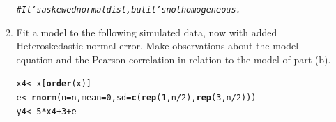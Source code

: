 \documentclass{article}\usepackage[]{graphicx}\usepackage[]{color}
\makeatletter
\newcommand{\hlnum}[1]{\textcolor[rgb]{0.686,0.059,0.569}{#1}}%
\newcommand{\hlcom}[1]{\textcolor[rgb]{0.678,0.584,0.686}{\textit{#1}}}%
\newcommand{\hlopt}[1]{\textcolor[rgb]{0,0,0}{#1}}%
\newcommand{\hlstd}[1]{\textcolor[rgb]{0.345,0.345,0.345}{#1}}%
\newcommand{\hlkwb}[1]{\textcolor[rgb]{0.69,0.353,0.396}{#1}}%
\newcommand{\hlkwc}[1]{\textcolor[rgb]{0.333,0.667,0.333}{#1}}%
\newcommand{\hlkwd}[1]{\textcolor[rgb]{0.737,0.353,0.396}{\textbf{#1}}}%
\newenvironment{kframe}{%
 \def\at@end@of@kframe{}%
 \ifinner\ifhmode%
  \def\at@end@of@kframe{\end{minipage}}%
  \begin{minipage}{\columnwidth}%
 \fi\fi%
 \def\FrameCommand##1{\hskip\@totalleftmargin \hskip-\fboxsep
 \colorbox{shadecolor}{##1}\hskip-\fboxsep
     \hskip-\linewidth \hskip-\@totalleftmargin \hskip\columnwidth}%
 \MakeFramed {\advance\hsize-\width
   \@totalleftmargin\z@ \linewidth\hsize
   \@setminipage}}%
 {\par\unskip\endMakeFramed%
 \at@end@of@kframe}
\newenvironment{knitrout}{}{} %
\makeatother
\begin{document}
\begin{enumerate}
\begin{enumerate}
\begin{knitrout}
\begin{kframe}
{\ttfamily\noindent\bfseries\color{errorcolor}{\#\# Error in p1 | p4: operations are possible only for numeric, logical or complex types}}\begin{alltt}
\hlcom{#It's a skewed normal dist, but it's not homogeneous.}
\end{alltt}
\end{kframe}
\end{knitrout}
\item Fit a model to the following simulated data, now with added Heteroskedastic
normal error. Make observations about the model equation and the Pearson correlation
in relation to the model of part (b).
\begin{knitrout}
\color{fgcolor}\begin{kframe}
\begin{alltt}
\hlstd{x4}\hlkwb{<-}\hlstd{x[}\hlkwd{order}\hlstd{(x)]}
\hlstd{e}\hlkwb{<-}\hlkwd{rnorm}\hlstd{(}\hlkwc{n}\hlstd{=n,}\hlkwc{mean}\hlstd{=}\hlnum{0}\hlstd{,}\hlkwc{sd}\hlstd{=}\hlkwd{c}\hlstd{(}\hlkwd{rep}\hlstd{(}\hlnum{1}\hlstd{,n}\hlopt{/}\hlnum{2}\hlstd{),}\hlkwd{rep}\hlstd{(}\hlnum{3}\hlstd{,n}\hlopt{/}\hlnum{2}\hlstd{)))}
\hlstd{y4}\hlkwb{<-}\hlnum{5}\hlopt{*}\hlstd{x4} \hlopt{+} \hlnum{3} \hlopt{+} \hlstd{e}


\end{alltt}
\end{kframe}
\end{knitrout}
\end{enumerate}
\end{enumerate}
\end{document}
